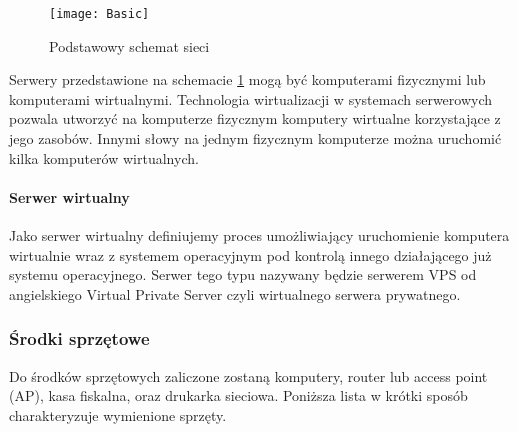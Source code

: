 				\begin{figure}[H]
					\centering
					\texttt{[image: Basic]}
					\caption{Podstawowy schemat sieci}
					\label{basic_net}
				\end{figure}
				
				\par Serwery przedstawione na schemacie \ref{basic_net} mogą być komputerami fizycznymi lub komputerami wirtualnymi. Technologia wirtualizacji w systemach serwerowych pozwala utworzyć na komputerze fizycznym komputery wirtualne korzystające z jego zasobów. Innymi słowy na jednym fizycznym komputerze można uruchomić kilka komputerów wirtualnych. 
		
				\paragraph{Serwer wirtualny}
				\par Jako serwer wirtualny definiujemy proces umożliwiający uruchomienie komputera wirtualnie wraz z systemem operacyjnym pod kontrolą innego działającego już systemu operacyjnego. Serwer tego typu nazywany będzie serwerem VPS od angielskiego Virtual Private Server czyli wirtualnego serwera prywatnego.
		
			\subsubsection{Środki sprzętowe}	
				\par Do środków sprzętowych zaliczone zostaną komputery, router lub access point (AP), kasa fiskalna, oraz drukarka sieciowa. Poniższa lista w krótki sposób charakteryzuje wymienione sprzęty.
				
